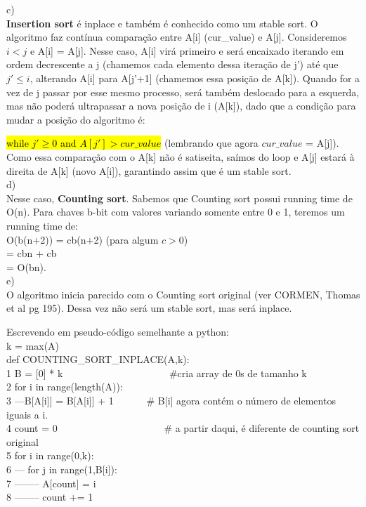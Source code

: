 \documentclass{article}
\begin{document}
c) \\
\textbf{Insertion sort} é inplace e também é conhecido como um stable sort. O algoritmo faz contínua comparação entre A[i] (cur\_value) e A[j]. Consideremos $i < j$ e A[i] = A[j]. Nesse caso, A[i] virá primeiro e será encaixado iterando em ordem decrescente a j (chamemos cada elemento dessa iteração de j') até que $j'\leq i$, alterando A[i] para A[j'+1] (chamemos essa posição de A[k]). Quando for a vez de j passar por esse mesmo processo, será também deslocado para a esquerda, mas não poderá ultrapassar a nova posição de i  (A[k]), dado que a condição para mudar a posição do algoritmo é: 

\hl{while $j' \geq 0$ and $A[j'] > cur\_value$} (lembrando que agora $cur\_value$ = A[j]).\\

Como essa comparação com o A[k] não é satiseita, saímos do loop e A[j] estará à direita de A[k] (novo A[i]), garantindo assim que é um stable sort.
\\


d) \\
Nesse caso, \textbf{Counting sort}. Sabemos que Counting sort possui running time de O(n). Para chaves b-bit com valores variando somente entre 0 e 1, teremos um running time de:\\
O(b(n+2)) = cb(n+2) (para algum $c>0$) \\
= cbn + cb\\
= O(bn).
\\

e)\\
O algoritmo inicia parecido com o Counting sort original (ver CORMEN, Thomas et al pg 195). Dessa vez não será um stable sort, mas será inplace.

Escrevendo em pseudo-código semelhante a python:\\

k = max(A)\\

def COUNTING\_SORT\_INPLACE(A,k):\\
1 B = [0] * k
 \ \ \ \ \ \ \ \ \ \ \ \ \ \ \ \ \ \ \ \ \ \#cria array de 0s de tamanho k\\
2 for i in range(length(A)):\\
3 ---\-B[A[i]] = B[A[i]] + 1 
 \ \ \ \ \ \ \# B[i] agora contém o número de elementos iguais a i.\\
4 count = 0
 \ \ \ \ \ \ \ \ \ \ \ \ \ \ \ \ \ \ \ \ \ \# a partir daqui, é diferente de counting sort original\\
5 for i in range(0,k):\\
6 ---\- for j in range(1,B[i]):\\
7 -------- A[count] = i\\
8 -------- count += 1\\
\end{document}
